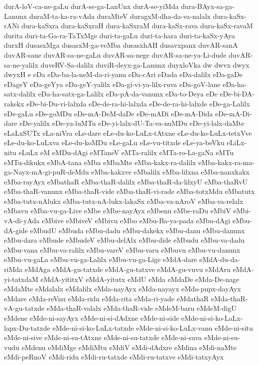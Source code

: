 {durA-loV-ca-ne-gaLu
durA-se-ga-LanUnx
durA-se-yiMda
dura-BAyx-sa-ga-Lanunx
duraM-ta-ka-ra-vAda
duraMteV
duragxM-dha-da-va-nalalx
dura-kaSx-rANi
dura-kaSxra
dura-kaSxraH
dura-kaSxraM
dura-kaSx-rava
dura-kaSx-ravaM
durita
duri-ta-Ga-ra-TaTxMge
duri-ta-gaLu
duri-ta-hara
duri-ta-kaSx-yAya
durxH
dusasxMga
dusasxM-ga-veMba
dusasxhAH
dusavxpanx
duvAR-sanA
duvAR-sane
duvAR-sa-ne-gaLu
duvAR-sa-nege
duvAR-sa-ne-ya-Li-dude
duvAR-sa-ne-yalilx
duveRV-Sa-dalilx
duviR-deyx-ga-Lanunx
duyxloVka
dw
dwvx
dwyx
dwyxH
e
eDa
eDa-ba-la-neM-da-ri-yanu
eDa-cAri
eDada
eDa-dalilx
eDa-gaDe
eDageY
eDa-geYya
eDa-geY-yalilx
eDa-gi-vi-ya-lilx-ruva
eDa-goV-lane
eDa-ha-satx-dalilx
eDa-ha-satx-ga-Lalilx
eDa-pA-da-vanunx
eDa-to-Deya
eDe
eDe-bi-DA-rakekx
eDe-bi-Du-vi-lalxda
eDe-de-ra-hi-lalxda
eDe-de-ra-hi-lalxde
eDe-ga-Lalilx
eDe-gaLu
eDe-goMDu
eDe-mA-DeM-daDe
eDe-mADi
eDe-mA-Dida
eDe-mA-Di-dare
eDe-yalilx
eDe-ya-luMTu
eDe-yi-lalx-dU-Ta-va-nuMDu
eDe-yi-lalx-daMte
eLaLxSUTx
eLa-niVra
eLe-dare
eLe-du-ko-LuLx-tAtxne
eLe-du-ko-LuLx-tetxVve
eLe-du-ko-LuLxva
eLe-du-koMDu
eLe-gaLu
eLe-vu-titxde
eLe-ya-beVku
eLiLx-nitu
eLuLx
eM
eMDu-dAgi
eMTaneV
eMTa-ralilx
eMTa-ro-La-gaNa
eMTu
eMTu-dikukx
eMbA-tana
eMba
eMbaMte
eMba-kakx-ra-dalilx
eMba-kakx-ra-ma-ga-Nayx-mA-gi-puR-deMdu
eMba-kakxve
eMbalilx
eMba-lilxna
eMba-nanxkakx
eMba-rayAyx
eMbathaR
eMba-thaR-dalilx
eMba-thaR-da-lilxyU
eMba-thaRvU
eMba-thaR-vanunx
eMba-thaR-vide
eMba-thaR-vi-rade
eMba-totxMdu
eMbatutx
eMba-tutx-nAlukx
eMba-tutx-nA-lukx-lakaSx
eMba-va-nAroV
eMba-va-relalx
eMbavu
eMba-vu-ga-Live
eMbe
eMbe-nayAyx
eMbenu
eMbe-raDu
eMbiV
eMbi-vA-di-yAda
eMbive
eMbiveV
eMbivu
eMbo
eMbu-Ba-ya-pada
eMbu-dAgi
eMbu-dA-gide
eMbudU
eMbuda
eMbu-dadu
eMbu-dakekx
eMbu-danu
eMbu-danunx
eMbu-dara
eMbude
eMbudeV
eMbu-delAlx
eMbu-dide
eMbudu
eMbu-va-dadu
eMbu-vana
eMbu-va-ralilx
eMbu-vareV
eMbu-varu
eMbuvu
eMbu-vu-danunx
eMbu-vu-gaLa
eMbu-vu-ga-Lalilx
eMbu-vu-ga-Lige
eMdA-dare
eMdA-du-da-riMda
eMdAga
eMdA-gu-tatxde
eMdA-gu-tatxve
eMdA-gu-vuvu
eMdAru
eMdA-yi-tatxdaM
eMdA-yititxV
eMdA-yitutx
eMdU
eMda
eMdaDe
eMda-De-nage
eMdaMte
eMdalalx
eMdalilx
eMda-nayAyx
eMda-nayayx
eMda-pupx-dayAyx
eMdare
eMda-reVnu
eMda-ridu
eMda-rita
eMda-ri-yade
eMdathaR
eMda-thaR-vA-gu-tatxde
eMda-thaR-valalx
eMda-thaR-vide
eMdeM-baru
eMdeM-digU
eMdene
eMde-ni-sayAyx
eMde-ni-si-dAdxne
eMde-ni-side
eMde-ni-si-ko-LaLx-lapx-Du-tatxde
eMde-ni-si-ko-LuLx-tatxde
eMde-ni-si-ko-LuLx-vanu
eMde-ni-situ
eMde-ni-sive
eMde-ni-su-tAtxne
eMde-ni-su-tatxde
eMde-ni-suva
eMde-ni-su-vudu
eMdenu
eMdiMge
eMdiMtu
eMdiV
eMdi-dAdxre
eMdina
eMdi-naMte
eMdi-peRnoV
eMdi-ridu
eMdi-ru-tatxde
eMdi-ru-tatxve
eMdi-tatxyAyx
}
